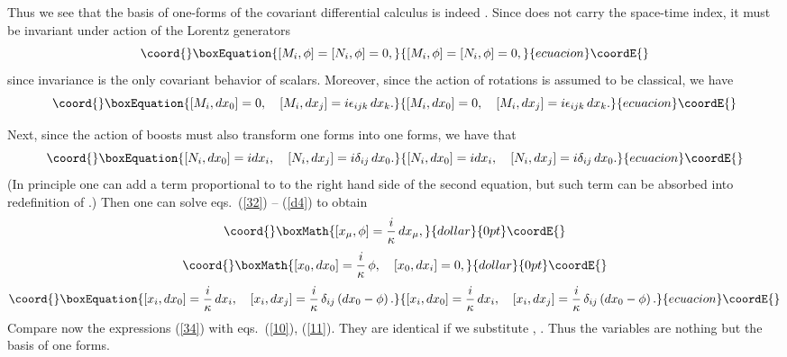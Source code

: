 \documentclass  [12pt] {article}
\begin{document}
Thus we see that the basis of one-forms of the covariant differential calculus
is indeed \coordHE{}. Since \myHighlight{$\phi$}\coordHE{} does not carry the space-time
index,  it must be invariant under action of the Lorentz generators
\begin{equation}\coord{}\boxEquation{\label{f1}
[M_i, \phi] = [N_i,\phi] =0,
}{[M_i, \phi] = [N_i,\phi] =0,
}{ecuacion}\coordE{}\end{equation}
 since invariance is the only covariant behavior of scalars. Moreover, since the action of rotations is
 assumed to be classical, we have
\begin{equation}\coord{}\boxEquation{\label{f2}
[M_i, dx_0] =0, \quad [M_i, dx_j] = i\epsilon_{ijk}\, dx_k.
}{[M_i, dx_0] =0, \quad [M_i, dx_j] = i\epsilon_{ijk}\, dx_k.
}{ecuacion}\coordE{}\end{equation}

Next, since the action of boosts must also transform one forms into one forms,
we have that
\begin{equation}\coord{}\boxEquation{\label{f3}
 [N_i, dx_0] = idx_i , \quad [N_i,dx_j] = i \delta_{ij} \, dx_0.
}{[N_i, dx_0] = idx_i , \quad [N_i,dx_j] = i \delta_{ij} \, dx_0.
}{ecuacion}\coordE{}\end{equation}
(In principle one can add a term proportional to \coordHE{} to the
right hand side of the second equation, but such term can be absorbed into
redefinition of \coordHE{}.) Then one can solve eqs.~(\ref{32}) --
 (\ref{d4}) to obtain
$$\coord{}\boxMath{
[x_\mu, \phi] = \frac i\kappa\, dx_\mu, }{dollar}{0pt}\coordE{}$$  $$\coord{}\boxMath{ [x_0, dx_0] = \frac i\kappa\,
\phi, \quad [x_0, dx_i] = 0,
}{dollar}{0pt}\coordE{}$$
\begin{equation}\coord{}\boxEquation{\label{34}
[x_i, dx_0] = \frac i\kappa\, dx_i, \quad [x_i, dx_j] = \frac i\kappa\,
\delta_{ij} \left( dx_0 - \phi\right).
}{[x_i, dx_0] = \frac i\kappa\, dx_i, \quad [x_i, dx_j] = \frac i\kappa\,
\delta_{ij} \left( dx_0 - \phi\right).
}{ecuacion}\coordE{}\end{equation}
Compare now the expressions (\ref{34}) with eqs.~(\ref{10}), (\ref{11}). They
are identical if we substitute \coordHE{}, \coordHE{}. Thus the
\coordHE{} variables are nothing but the basis of one forms.
\newline
\end{document}
